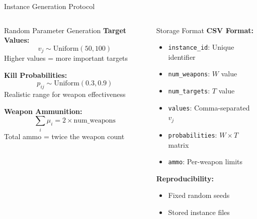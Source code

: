 \documentclass[aspectratio=43,8pt]{beamer}
\begin{document}
\begin{frame}{Instance Generation Protocol}
\begin{columns}[t]
\begin{block}{Random Parameter Generation}
\textbf{Target Values:}
$$v_j \sim \text{Uniform}(50, 100)$$
{\small Higher values = more important targets}

\vspace{0.2cm}
\textbf{Kill Probabilities:}
$$p_{ij} \sim \text{Uniform}(0.3, 0.9)$$
{\small Realistic range for weapon effectiveness}

\vspace{0.2cm}
\textbf{Weapon Ammunition:}
$$\sum_{i} \mu_i = 2 \times \text{num\_weapons}$$
{\small Total ammo = twice the weapon count}
\end{block}

\begin{exampleblock}{Storage Format}
\textbf{CSV Format:}
\begin{itemize}
    \item \texttt{instance\_id}: Unique identifier
    \item \texttt{num\_weapons}: $W$ value
    \item \texttt{num\_targets}: $T$ value
    \item \texttt{values}: Comma-separated $v_j$
    \item \texttt{probabilities}: $W \times T$ matrix
    \item \texttt{ammo}: Per-weapon limits
\end{itemize}

\vspace{0.2cm}
\textbf{Reproducibility:}
\begin{itemize}
    \item Fixed random seeds
    \item Stored instance files
\end{itemize}
\end{exampleblock}
\end{columns}
\end{frame}
\end{document}

